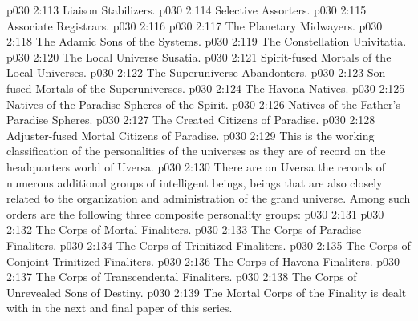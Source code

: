 \vs p030 2:113 \bibnobreakspace Liaison Stabilizers.
\vs p030 2:114 \bibnobreakspace Selective Assorters.
\vs p030 2:115 \bibnobreakspace Associate Registrars.
\vs p030 2:116 \bibnobreakspace {}
\vs p030 2:117 \bibnobreakspace The Planetary Midwayers.
\vs p030 2:118 \bibnobreakspace The Adamic Sons of the Systems.
\vs p030 2:119 \bibnobreakspace The Constellation Univitatia.
\vs p030 2:120 \bibnobreakspace The Local Universe Susatia.
\vs p030 2:121 \bibnobreakspace Spirit\hyp{}fused Mortals of the Local Universes.
\vs p030 2:122 \bibnobreakspace The Superuniverse Abandonters.
\vs p030 2:123 \bibnobreakspace Son\hyp{}fused Mortals of the Superuniverses.
\vs p030 2:124 \bibnobreakspace The Havona Natives.
\vs p030 2:125 \bibnobreakspace Natives of the Paradise Spheres of the Spirit.
\vs p030 2:126 \bibnobreakspace Natives of the Father’s Paradise Spheres.
\vs p030 2:127 \bibnobreakspace The Created Citizens of Paradise.
\vs p030 2:128 \bibnobreakspace Adjuster\hyp{}fused Mortal Citizens of Paradise.
\vs p030 2:129 \pc This is the working classification of the personalities of the universes as they are of record on the headquarters world of Uversa.
\vs p030 2:130 \pc {}  There are on Uversa the records of numerous additional groups of intelligent beings, beings that are also closely related to the organization and administration of the grand universe. Among such orders are the following three composite personality groups:
\vs p030 2:131 \bibnobreakspace {}
\vs p030 2:132 \bibnobreakspace The Corps of Mortal Finaliters.
\vs p030 2:133 \bibnobreakspace The Corps of Paradise Finaliters.
\vs p030 2:134 \bibnobreakspace The Corps of Trinitized Finaliters.
\vs p030 2:135 \bibnobreakspace The Corps of Conjoint Trinitized Finaliters.
\vs p030 2:136 \bibnobreakspace The Corps of Havona Finaliters.
\vs p030 2:137 \bibnobreakspace The Corps of Transcendental Finaliters.
\vs p030 2:138 \bibnobreakspace The Corps of Unrevealed Sons of Destiny.
\vs p030 2:139 \pc The Mortal Corps of the Finality is dealt with in the next and final paper of this series.
